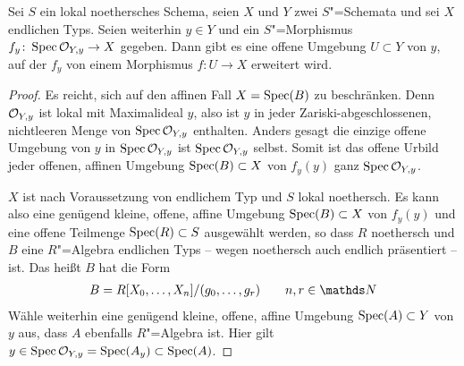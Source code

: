\begin{Lemma}\label{thm:morphismuserweiterung}
  Sei $S$ ein lokal noethersches Schema,
  seien $X$ und $Y$ zwei $S$"=Schemata und
  sei $X$ endlichen Typs.
  Seien weiterhin $y\in Y$ und 
  ein $S$"=Morphismus ${f_y\colon \operatorname{Spec}\mathcal{O}_{Y,y}\to X}$ gegeben.
  Dann gibt es eine offene Umgebung ${U\subset Y}$ von $y$, auf der
  $f_y$ von einem Morphismus ${f\colon U\to X}$ erweitert wird.
  \begin{proof}
    Es reicht, sich auf den affinen Fall $X=\operatorname{Spec}(B)$ zu beschränken.
    Denn $\mathcal{O}_{Y,y}$ ist lokal mit Maximalideal $y$, also ist $y$ in
    jeder Zariski-abgeschlossenen, nichtleeren Menge von
    $\operatorname{Spec}\mathcal{O}_{Y,y}$ enthalten. Anders gesagt die einzige offene
    Umgebung von $y$ in $\operatorname{Spec}\mathcal{O}_{Y,y}$ ist $\operatorname{Spec}\mathcal{O}_{Y,y}$ selbst.
    Somit ist das offene Urbild jeder offenen, affinen Umgebung
    ${\operatorname{Spec}(B)\subset X}$ von $f_y(y)$ ganz $\operatorname{Spec}\mathcal{O}_{Y,y}$.

    $X$ ist nach Voraussetzung von endlichem Typ und $S$ lokal
    noethersch.
    Es kann also eine genügend kleine, offene, affine Umgebung
    ${\operatorname{Spec}(B)\subset X}$ von $f_y(y)$ und eine offene Teilmenge
    ${\operatorname{Spec}(R)\subset S}$ ausgewählt werden,
    so dass $R$ noethersch und $B$ eine $R$"=Algebra endlichen Typs
    – wegen noethersch auch endlich präsentiert – ist. Das heißt $B$
    hat die Form
    \begin{gather*}
      B=R[X_0,\dotsc, X_n]/(g_0,\dotsc, g_r)\qquad n,r\in\N
    \end{gather*}
    Wähle weiterhin eine genügend kleine, offene, affine Umgebung
    ${\operatorname{Spec}(A)\subset Y}$ von $y$ aus, dass $A$ ebenfalls $R$"=Algebra ist.
    Hier gilt ${y\in\operatorname{Spec}\mathcal{O}_{Y,y}=\operatorname{Spec}(A_y)\subset\operatorname{Spec}(A)}$.
    

\end{proof}
\end{Lemma}
